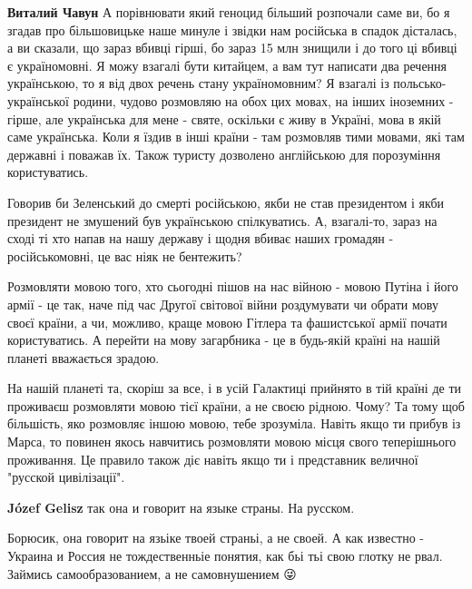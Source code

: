 \begin{itemize}
\begin{itemize}

\textbf{Виталий Чавун} А порівнювати який геноцид більший розпочали саме ви, бо
я згадав про більшовицьке наше минуле і звідки нам російська в спадок
дісталась, а ви сказали, що зараз вбивці гірші, бо зараз 15 млн знищили і до
того ці вбивці є україномовні. 
Я можу взагалі бути китайцем, а вам тут написати два речення українською, то я
від двох речень стану україномовним? Я взагалі із польсько-української родини,
чудово розмовляю на обох цих мовах, на інших іноземних - гірше, але українська
для мене - святе, оскільки є живу в Україні, мова в якій саме українська. Коли
я їздив в інші країни - там розмовляв тими мовами, які там державні і поважав
їх. Також туристу дозволено англійською для порозуміння користуватись. 

Говорив би Зеленський до смерті російською, якби не став президентом і якби
президент не змушений був українською спілкуватись. А, взагалі-то, зараз на
сході ті хто напав на нашу державу і щодня вбиває наших громадян -
російськомовні, це вас ніяк не бентежить? 

Розмовляти мовою того, хто сьогодні пішов на нас війною - мовою Путіна і його
армії - це так, наче під час Другої світової війни роздумувати чи обрати мову
своєї країни, а чи, можливо, краще мовою Гітлера та фашистської армії почати
користуватись. А перейти на мову загарбника - це в будь-якій країні на нашій
планеті вважається зрадою.

\end{itemize}


На нашій планеті та, скоріш за все, і в усій Галактиці прийнято в тій країні де
ти проживаєш розмовляти мовою тієї країни, а не своєю рідною. Чому? Та тому щоб
більшість, яко розмовляє іншою мовою, тебе зрозуміла. Навіть якщо ти прибув із
Марса, то повинен якось навчитись розмовляти мовою місця свого теперішнього
проживання. Це правило також діє навіть якщо ти і представник величної "русской
цивілізації".

\begin{itemize}

\textbf{Józef Gelisz} так она и говорит на языке страны. На русском.



Борюсик, она говорит на язьіке твоей страньі, а не своей. А как известно -
Украина и Россия не тождественньіе понятия, как бьі тьі свою глотку не рвал.
Займись самообразованием, а не самовнушением 😜


\end{itemize}
\end{itemize}
